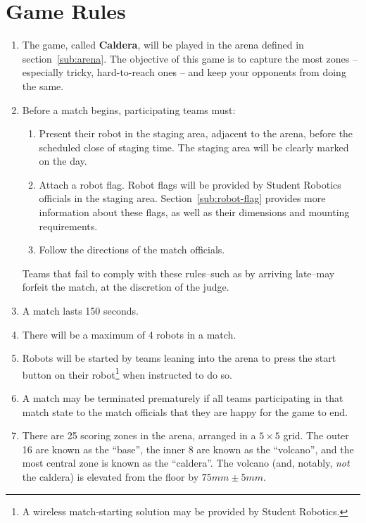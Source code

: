 \section {Game Rules}
\label{game-rules}

\begin{enumerate}
\item The game, called \textbf{Caldera}, will be played in the arena defined in section~\ref{sub:arena}.  The objective of this game is to capture the most zones -- especially tricky, hard-to-reach ones -- and keep your opponents from doing the same.

\item Before a match begins, participating teams must:
\begin {enumerate}
  \item Present their robot in the staging area, adjacent to the arena, before the scheduled close of staging time.
        The staging area will be clearly marked on the day.

  \item Attach a robot flag.
        Robot flags will be provided by Student Robotics officials in the staging area.
        Section~\ref{sub:robot-flag} provides more information about these flags, as well as their dimensions and mounting requirements.

  \item Follow the directions of the match officials.
\end{enumerate}
  Teams that fail to comply with these rules--such as by arriving late--may forfeit the match, at the discretion of the judge.

\item A match lasts 150 seconds.

\item There will be a maximum of 4 robots in a match.

\item Robots will be started by teams leaning into the arena to press the start button on their robot\footnote{A wireless match-starting solution may be provided by Student Robotics.} when instructed to do so.

\item A match may be terminated prematurely if all teams participating in that match state to the match officials that they are happy for the game to end.

\item There are 25 scoring zones in the arena, arranged in a $5\times5$ grid. The outer 16 are known as the ``base'', the inner 8 are known as the ``volcano'', and the most central zone is known as the ``caldera''. The volcano (and, notably, \emph{not} the caldera) is elevated from the floor by $75 mm \pm 5 mm$.


\end{enumerate}
